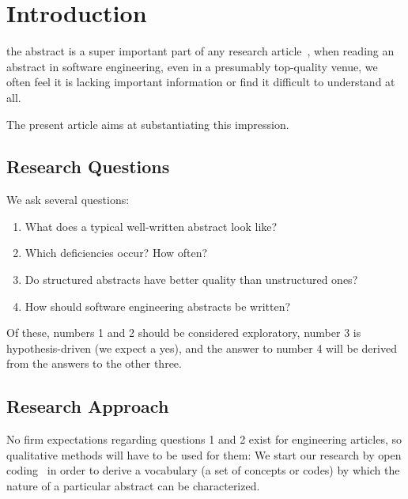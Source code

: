 \documentclass[10pt,journal,compsoc]{IEEEtran}
\begin{document}
\section{Introduction}
 the abstract is a super important part of any research article~\cite{Lang22},
when reading an abstract in software engineering, even in a presumably top-quality venue,
we often feel it is lacking important information or find it difficult to understand at all.

The present article aims at substantiating this impression.




\subsection{Research Questions}

\noindent
We ask several questions:
\begin{enumerate}
	\item What does a typical well-written abstract look like?
	\item Which deficiencies occur? How often?
	\item Do structured abstracts have better quality than unstructured ones?
	\item How should software engineering abstracts be written?
\end{enumerate}
Of these, numbers 1 and 2 should be considered exploratory,
number 3 is hypothesis-driven (we expect a yes), and
the answer to number 4 will be derived from the answers to the other three.


\subsection{Research Approach}

No firm expectations regarding questions 1 and 2 exist for engineering articles,
so qualitative methods will have to be used for them:
We start our research by open coding~\cite[Ch. 5]{StrCor90} in order to derive a vocabulary (a set of concepts or codes)
by which the nature of a particular abstract can be characterized.
\end{document}
